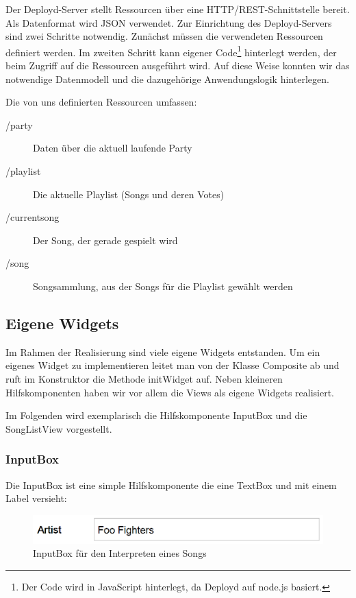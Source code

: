 Der Deployd-Server stellt Ressourcen über eine HTTP/REST-Schnittstelle bereit. Als
Datenformat wird JSON verwendet. Zur Einrichtung des Deployd-Servers sind zwei Schritte
notwendig. Zunächst müssen die verwendeten Ressourcen definiert werden. Im zweiten
Schritt kann eigener Code\footnote{Der Code wird in JavaScript hinterlegt, da Deployd auf node.js basiert.} hinterlegt werden, der beim Zugriff auf die Ressourcen
ausgeführt wird. Auf diese Weise konnten wir das notwendige Datenmodell und die
dazugehörige Anwendungslogik hinterlegen.

Die von uns definierten Ressourcen umfassen:
\begin{description}
	\item[/party] Daten über die aktuell laufende Party
	\item[/playlist] Die aktuelle Playlist (Songs und deren Votes)
	\item[/currentsong] Der Song, der gerade gespielt wird
	\item[/song] Songsammlung, aus der Songs für die Playlist gewählt werden
\end{description}

\subsection{Eigene Widgets}
Im Rahmen der Realisierung sind viele eigene Widgets entstanden. Um ein eigenes Widget zu implementieren leitet man von der Klasse Composite ab und ruft im Konstruktor die Methode initWidget auf. Neben kleineren Hilfskomponenten haben wir vor allem die Views als eigene Widgets realisiert.

Im Folgenden wird exemplarisch die Hilfskomponente InputBox und die SongListView vorgestellt.

\subsubsection{InputBox}
Die InputBox ist eine simple Hilfskomponente die eine TextBox und mit einem Label versieht:

\begin{figure}[H]
\centering
\includegraphics[width=0.7\linewidth]{Bilder/InputBox}
\caption{InputBox für den Interpreten eines Songs}
\label{fig:InputBox}
\end{figure}

